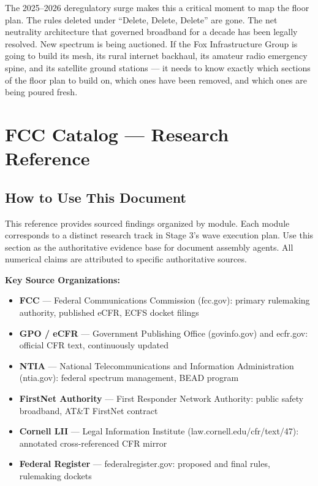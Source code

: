 \documentclass[11pt,letterpaper]{article}
\newcommand{\stageheader}[2]{%
  \noindent\colorbox{#2}{\makebox[\textwidth][l]{%
    \textcolor{white}{\bfseries\sffamily\hspace{6pt}#1\hspace{6pt}}}}%
  \vspace{0.5em}\par%
}
\begin{document}
The 2025--2026 deregulatory surge makes this a critical moment to map the floor plan. The rules deleted under ``Delete, Delete, Delete'' are gone. The net neutrality architecture that governed broadband for a decade has been legally resolved. New spectrum is being auctioned. If the Fox Infrastructure Group is going to build its mesh, its rural internet backhaul, its amateur radio emergency spine, and its satellite ground stations --- it needs to know exactly which sections of the floor plan to build on, which ones have been removed, and which ones are being poured fresh.

\newpage

\stageheader{STAGE 2 --- RESEARCH REFERENCE}{secondary}

\section{FCC Catalog --- Research Reference}

\subsection{How to Use This Document}

This reference provides sourced findings organized by module. Each module corresponds to a distinct research track in Stage 3's wave execution plan. Use this section as the authoritative evidence base for document assembly agents. All numerical claims are attributed to specific authoritative sources.

\textbf{Key Source Organizations:}
\begin{itemize}[leftmargin=1.5em]
  \item \textbf{FCC} --- Federal Communications Commission (fcc.gov): primary rulemaking authority, published eCFR, ECFS docket filings
  \item \textbf{GPO / eCFR} --- Government Publishing Office (govinfo.gov) and ecfr.gov: official CFR text, continuously updated
  \item \textbf{NTIA} --- National Telecommunications and Information Administration (ntia.gov): federal spectrum management, BEAD program
  \item \textbf{FirstNet Authority} --- First Responder Network Authority: public safety broadband, AT\&T FirstNet contract
  \item \textbf{Cornell LII} --- Legal Information Institute (law.cornell.edu/cfr/text/47): annotated cross-referenced CFR mirror
  \item \textbf{Federal Register} --- federalregister.gov: proposed and final rules, rulemaking dockets
\end{itemize}
\end{document}
